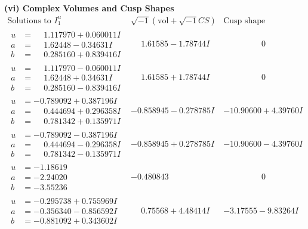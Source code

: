 \documentclass[1p]{elsarticle_modified}
\theoremstyle{definition}
\newcommand{\I}{\sqrt{-1}}
\begin{document}
\newpage\flushleft \textbf{(vi) Complex Volumes and Cusp Shapes}
$$\begin{array}{c|c|c}  
\text{Solutions to }I^u_{1}& \I (\text{vol} + \sqrt{-1}CS) & \text{Cusp shape}\\
 \hline 
\begin{aligned}
u &= \phantom{-}1.117970 + 0.060011 I \\
a &= \phantom{-}1.62448 - 0.34631 I \\
b &= \phantom{-}0.285160 + 0.839416 I\end{aligned}
 & \phantom{-}1.61585 - 1.78744 I & \phantom{-0.000000 } 0 \\ \hline\begin{aligned}
u &= \phantom{-}1.117970 - 0.060011 I \\
a &= \phantom{-}1.62448 + 0.34631 I \\
b &= \phantom{-}0.285160 - 0.839416 I\end{aligned}
 & \phantom{-}1.61585 + 1.78744 I & \phantom{-0.000000 } 0 \\ \hline\begin{aligned}
u &= -0.789092 + 0.387196 I \\
a &= \phantom{-}0.444694 + 0.296358 I \\
b &= \phantom{-}0.781342 + 0.135971 I\end{aligned}
 & -0.858945 - 0.278785 I & -10.90600 + 4.39760 I \\ \hline\begin{aligned}
u &= -0.789092 - 0.387196 I \\
a &= \phantom{-}0.444694 - 0.296358 I \\
b &= \phantom{-}0.781342 - 0.135971 I\end{aligned}
 & -0.858945 + 0.278785 I & -10.90600 - 4.39760 I \\ \hline\begin{aligned}
u &= -1.18619\phantom{ +0.000000I} \\
a &= -2.24020\phantom{ +0.000000I} \\
b &= -3.55236\phantom{ +0.000000I}\end{aligned}
 & -0.480843\phantom{ +0.000000I} & \phantom{-0.000000 } 0 \\ \hline\begin{aligned}
u &= -0.295738 + 0.755969 I \\
a &= -0.356340 - 0.856592 I \\
b &= -0.881092 + 0.343602 I\end{aligned}
 & \phantom{-}0.75568 + 4.48414 I & -3.17555 - 9.83264 I \\ \hline\begin{aligned}

\end{aligned}
\end{array}$$
\end{document}
